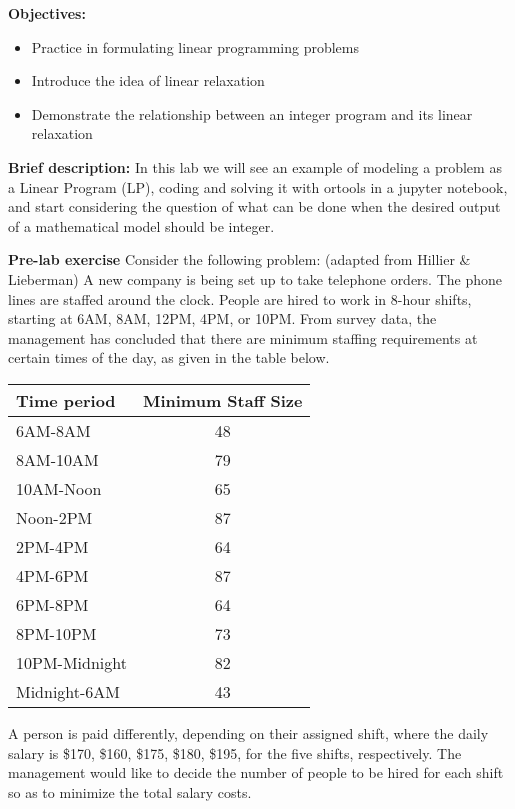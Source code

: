 \documentclass[twoside]{article}%
\begin{document}

\noindent
\textbf{Objectives:}

\begin{itemize} 
\item Practice in formulating linear programming problems
\item Introduce the idea of linear relaxation
\item Demonstrate the relationship between an integer program and its linear relaxation
\end{itemize}

\noindent
\textbf{Brief description:} 
In this lab we will see an example of modeling a problem as a Linear Program (LP),
coding and solving it with ortools in a jupyter notebook, and start considering the question of what can be done when the desired
output of a mathematical model should be integer.

\noindent
\textbf{Pre-lab exercise}
Consider the following problem: (adapted from Hillier \& Lieberman) A new company is being set up to take
telephone orders. The phone lines are staffed around the clock. People are hired to work in 8-hour shifts,
starting at 6AM, 8AM, 12PM, 4PM, or 10PM. From survey data, the management has concluded that there
are minimum staffing requirements at certain times of the day, as given in the table below.

\begin{center}
\begin{tabular}{|l|c|}
\hline
Time period & Minimum Staff Size\\
\hline
6AM-8AM & 48 \\
\hline
8AM-10AM & 79 \\
\hline
10AM-Noon & 65 \\
\hline
Noon-2PM & 87 \\
\hline
2PM-4PM & 64 \\
\hline
4PM-6PM & 87 \\
\hline
6PM-8PM & 64 \\
\hline
8PM-10PM & 73 \\
\hline
10PM-Midnight & 82 \\
\hline
Midnight-6AM & 43 \\
\hline
\end{tabular}
\end{center}
A person is paid differently, depending on their assigned shift, where the daily salary is \$170, \$160, \$175,
\$180, \$195, for the five shifts, respectively. The management would like to decide the number of people to
be hired for each shift so as to minimize the total salary costs.
\end{document}
